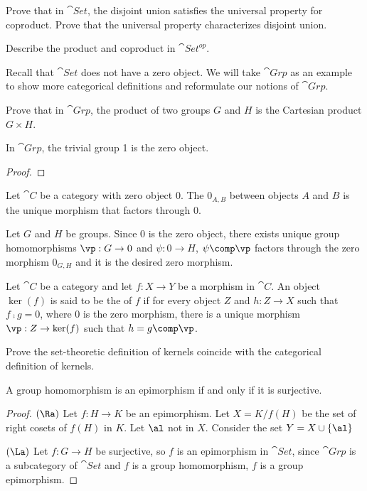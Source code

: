 \documentclass[10pt]{article}
\begin{document}
\begin{problem}
    Prove that in $\cat{Set}$, the disjoint union satisfies the universal property for coproduct. Prove that the universal property characterizes disjoint union.
\end{problem}
\begin{problem}
    Describe the product and coproduct in $\cat{{Set}^{op}}$. 
\end{problem}
\par
Recall that $\cat{Set}$ does not have a zero object. We will take $\cat{Grp}$ as an example to show more categorical definitions and reformulate our notions of $\cat{Grp}$.
\begin{problem}
    Prove that in $\cat{Grp}$, the product of two groups $G$ and $H$ is the Cartesian product $G\times H$.
\end{problem}
\begin{proposition}
    In $\cat{Grp}$, the trivial group 1 is the zero object.
\end{proposition}
\begin{proof}
    
\end{proof}
\begin{definition}
    Let $\cat{C}$ be a category with zero object 0. The  ${0}_{A,B}$ between objects $A$ and $B$ is the unique morphism that factors through 0.
\end{definition}
\par
Let $G$ and $H$ be groups. Since $0$ is the zero object, there exists unique group homomorphisms $\vp:G\to 0$ and $\psi:0\to H$, $\psi\comp\vp$ factors through the zero morphism ${0}_{G,H}$ and it is the desired zero morphism.
\begin{definition}
    Let $\cat{C}$ be a category and let $f:X\to Y$ be a morphism in $\cat{C}$. An object $\ker(f)$ is said to be the  of $f$ if for every object $Z$ and $h:Z\to X$ such that $f\comp g=0$, where $0$ is the zero morphism, there is a unique morphism $\vp:Z\to\ker(f)$ such that $h=g\comp\vp$.
\end{definition}
\begin{problem}
    Prove the set-theoretic definition of kernels coincide with the categorical definition of kernels.
\end{problem}
\begin{proposition}
    A group homomorphism is an epimorphism if and only if it is surjective.    
\end{proposition}
\begin{proof}
    $(\Ra)$ Let $f:H\to K$ be an epimorphism. Let $X=K/f(H)$ be the set of right cosets of $f(H)$ in $K$. Let $\al$ not in $X$. Consider the set $Y=X\cup\{\al\}$



    $(\La)$ Let $f:G\to H$ be surjective, so $f$ is an epimorphism in $\cat{Set}$, since $\cat{Grp}$ is a subcategory of $\cat{Set}$ and $f$ is a group homomorphism, $f$ is a group epimorphism.
\end{proof}
\end{document}
